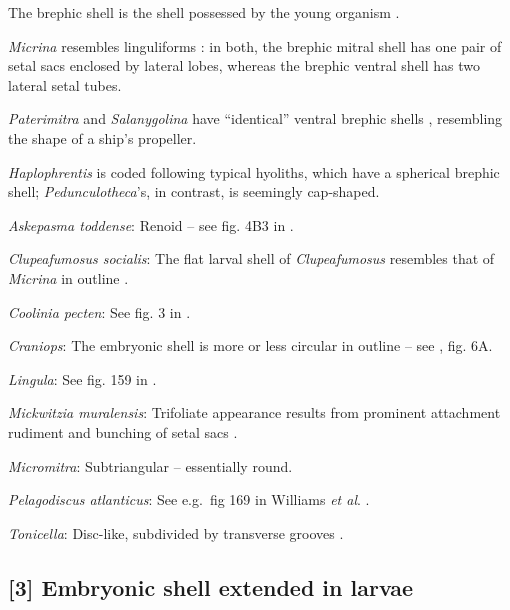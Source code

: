 \documentclass[openany]{book}
\theoremstyle{definition}
\theoremstyle{definition}
\theoremstyle{definition}
\theoremstyle{remark}
\begin{document}
The brephic shell is the shell possessed by the young organism
\citep[see][ and references therein for discussion of
terminology]{Ushatinskaya2016Revisionof}.

\emph{Micrina} resembles linguliforms \citep{Holmer2011Firstrecord}: in
both, the brephic mitral shell has one pair of setal sacs enclosed by
lateral lobes, whereas the brephic ventral shell has two lateral setal
tubes.

\emph{Paterimitra} and \emph{Salanygolina} have ``identical'' ventral
brephic shells \citep{Holmer2011Firstrecord}, resembling the shape of a
ship's propeller.

\emph{Haplophrentis} is coded following typical hyoliths, which have a
spherical brephic shell; \emph{Pedunculotheca}'s, in contrast, is
seemingly cap-shaped.

\hypertarget{Askepasma_toddense-coding-2}{}
\emph{Askepasma toddense}: Renoid -- see fig. 4B3 in
\citet{Topper2013Theoldest}.

\hypertarget{Clupeafumosus_socialis-coding-2}{}
\emph{Clupeafumosus socialis}: The flat larval shell of
\emph{Clupeafumosus} resembles that of \emph{Micrina} in outline
\citetext{\citealp{Topper2013Reappraisalof}; \citealp[cf.][]{Holmer2011Firstrecord}}.

\hypertarget{Coolinia_pecten-coding-2}{}
\emph{Coolinia pecten}: See fig. 3 in
\citet{Bassett2017Earliestontogeny}.

\hypertarget{Craniops-coding-2}{}
\emph{Craniops}: The embryonic shell is more or less circular in outline
-- see \citet{Freeman1999Changesin}, fig. 6A.

\hypertarget{Lingula-coding-2}{}
\emph{Lingula}: See fig. 159 in \citet{Williams1997Introduction}.

\hypertarget{Mickwitzia_muralensis-coding-2}{}
\emph{Mickwitzia muralensis}: Trifoliate appearance results from
prominent attachment rudiment and bunching of setal sacs
\citep{Balthasar2009Thebrachiopod}.

\hypertarget{Micromitra-coding-2}{}
\emph{Micromitra}: Subtriangular -- essentially round.

\hypertarget{Pelagodiscus_atlanticus-coding-2}{}
\emph{Pelagodiscus atlanticus}: See e.g.~fig 169 in Williams \emph{et
al}. \citeyearpar{Williams1997Introduction}.

\hypertarget{Tonicella-coding-2}{}
\emph{Tonicella}: Disc-like, subdivided by transverse grooves
\citep{Wanninger2002C}.

\subsection*{{[}3{]} Embryonic shell extended in
larvae}\label{embryonic-shell-extended-in-larvae}
\end{document}
